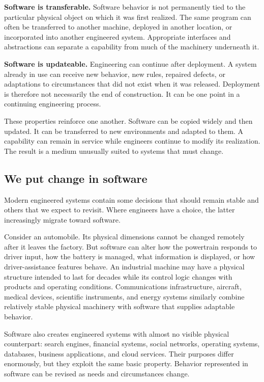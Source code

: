 \textbf{Software is transferable.} Software behavior is not permanently tied to the particular physical
object on which it was first realized. The same program can often be transferred to another machine,
deployed in another location, or incorporated into another engineered system. Appropriate interfaces
and abstractions can separate a capability from much of the machinery underneath it.

\textbf{Software is updateable.} Engineering can continue after deployment. A system already in use can
receive new behavior, new rules, repaired defects, or adaptations to circumstances that did not exist
when it was released. Deployment is therefore not necessarily the end of construction. It can be one
point in a continuing engineering process.

These properties reinforce one another. Software can be copied widely and then updated. It can be
transferred to new environments and adapted to them. A capability can remain in service while engineers
continue to modify its realization. The result is a medium unusually suited to systems that must
change.

\subsection{We put change in software}\label{sec-change-in-software}

Modern engineered systems contain some decisions that should remain stable and others that we expect to
revisit. Where engineers have a choice, the latter increasingly migrate toward software.

Consider an automobile. Its physical dimensions cannot be changed remotely after it leaves the factory.
But software can alter how the powertrain responds to driver input, how the battery is managed, what
information is displayed, or how driver-assistance features behave. An industrial machine may have a
physical structure intended to last for decades while its control logic changes with products and
operating conditions. Communications infrastructure, aircraft, medical devices, scientific instruments,
and energy systems similarly combine relatively stable physical machinery with software that supplies
adaptable behavior.

Software also creates engineered systems with almost no visible physical counterpart: search engines,
financial systems, social networks, operating systems, databases, business applications, and cloud
services. Their purposes differ enormously, but they exploit the same basic property. Behavior
represented in software can be revised as needs and circumstances change.

